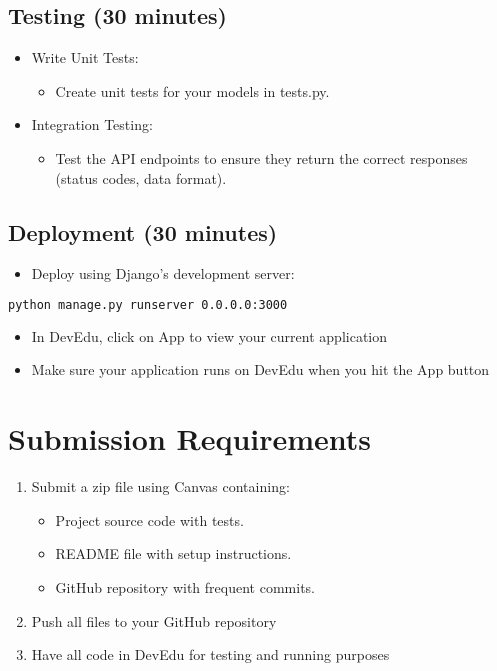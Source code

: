\documentclass{article}
\begin{document}
\subsection{Testing (30 minutes)}
\begin{itemize}
    \item Write Unit Tests: 
    \begin{itemize}
        \item Create unit tests for your models in tests.py.
    \end{itemize}
\end{itemize}
\begin{itemize}
    \item Integration Testing: 
    \begin{itemize}
        \item Test the API endpoints to ensure they return the correct responses (status codes, data format).
    \end{itemize}
\end{itemize}


\subsection{Deployment (30 minutes)}
\begin{itemize}
    \item Deploy using Django's development server:
\end{itemize}
\begin{lstlisting}[style=customcode,language=bash]
python manage.py runserver 0.0.0.0:3000
\end{lstlisting}

\begin{itemize}
    \item In DevEdu, click on App to view your current application
    \item Make sure your application runs on DevEdu when you hit the App button
\end{itemize}


\section{Submission Requirements}
\begin{enumerate}
    \item Submit a zip file using Canvas containing:
    \begin{itemize}
        \item Project source code with tests.
        \item README file with setup instructions.
        \item GitHub repository with frequent commits.
\end{itemize}
    \item Push all files to your GitHub repository
    \item Have all code in DevEdu for testing and running purposes
\end{enumerate}
\end{document}
